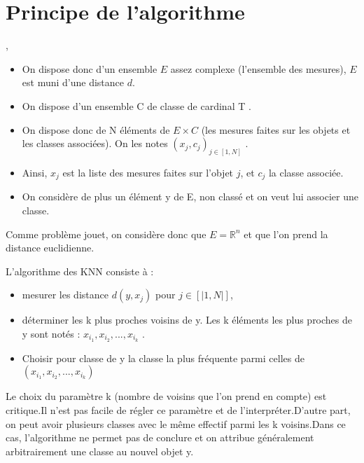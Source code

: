 \documentclass[letterpaper,10pt,english]{jupyterBook}
\begin{document}
\section{Principe de l’algorithme}
\label{\detokenize{notebooks/Machine-Learning/KNN-Cours:principe-de-lalgorithme}}
\sphinxAtStartPar
{},
\begin{itemize}
\item {} 
\sphinxAtStartPar
On dispose donc d’un ensemble \(E\) assez complexe (l’ensemble des mesures), \(E\) est muni d’une distance \(d\).

\item {} 
\sphinxAtStartPar
On dispose d’un ensemble C de classe de cardinal T .

\item {} 
\sphinxAtStartPar
On dispose donc de N éléments de \(E \times C\) (les mesures faites sur les objets et les classes associées). On les notes \((x_j , c_j)_{j\in [1, N]}\) .

\item {} 
\sphinxAtStartPar
Ainsi, \(x_j\) est la liste des mesures faites sur l’objet \(j\), et \(c_j\) la classe associée.

\item {} 
\sphinxAtStartPar
{} On considère de plus un élément y de E, non classé et on veut lui associer une classe.

\end{itemize}

\sphinxAtStartPar
{}
Comme problème jouet, on considère donc que \(E = \mathbb{R}^n\) et que l’on prend la distance
euclidienne.

\sphinxAtStartPar
L’algorithme des KNN consiste à :
\begin{itemize}
\item {} 
\sphinxAtStartPar
mesurer les distance \(d(y, x_j )\) pour \(j ∈ [|1, N|]\),

\item {} 
\sphinxAtStartPar
déterminer les k plus proches voisins de y. Les k éléments les plus proches de
y sont notés : \(x_{i_1} , x_{i_2} , . . . , x_{i_k}\) .

\item {} 
\sphinxAtStartPar
Choisir pour classe de y la classe la plus fréquente parmi celles de \((x_{i_1} , x_{i_2} , . . . , x_{i_k} )\)

\end{itemize}

\sphinxAtStartPar
Le choix du paramètre k (nombre de voisins que l’on prend en compte) est critique.Il n’est pas facile de régler ce paramètre et de l’interpréter.D’autre part, on peut avoir plusieurs classes avec le même effectif parmi les k voisins.Dans ce cas, l’algorithme ne permet pas de conclure et on attribue généralement arbitrairement une classe au nouvel objet y.
\end{document}
